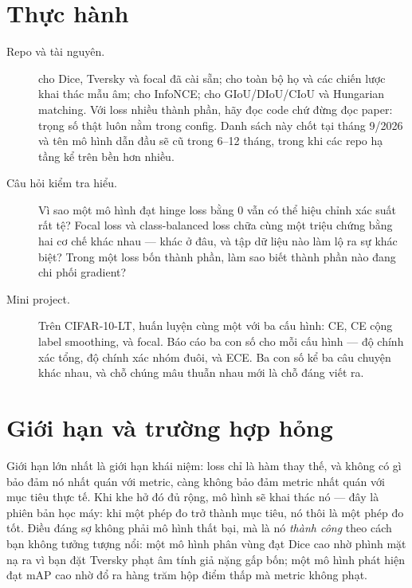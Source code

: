 \documentclass[../../deep_learning.tex]{subfiles}
\begin{document}
\section{Thực hành}

\begin{description}
\item[Repo và tài nguyên.]  cho Dice, Tversky và focal đã cài sẵn;  cho toàn bộ họ  và các chiến lược khai thác mẫu âm;  cho InfoNCE;  cho GIoU/DIoU/CIoU và Hungarian matching. Với loss nhiều thành phần, hãy đọc code chứ đừng đọc paper: trọng số thật luôn nằm trong config. Danh sách này chốt tại tháng 9/2026 và tên mô hình dẫn đầu sẽ cũ trong 6--12 tháng, trong khi các repo hạ tầng kể trên bền hơn nhiều.
\item[Câu hỏi kiểm tra hiểu.] Vì sao một mô hình đạt hinge loss bằng 0 vẫn có thể hiệu chỉnh xác suất rất tệ? Focal loss và class-balanced loss chữa cùng một triệu chứng bằng hai cơ chế khác nhau --- khác ở đâu, và tập dữ liệu nào làm lộ ra sự khác biệt? Trong một loss bốn thành phần, làm sao biết thành phần nào đang chi phối gradient?
\item[Mini project.] Trên CIFAR-10-LT, huấn luyện cùng một  với ba cấu hình: CE, CE cộng label smoothing, và focal. Báo cáo ba con số cho mỗi cấu hình --- độ chính xác tổng, độ chính xác nhóm đuôi, và ECE. Ba con số kể ba câu chuyện khác nhau, và chỗ chúng mâu thuẫn nhau mới là chỗ đáng viết ra.
\end{description}

\section{Giới hạn và trường hợp hỏng}

Giới hạn lớn nhất là giới hạn khái niệm: loss chỉ là hàm thay thế, và không có gì bảo đảm nó nhất quán với metric, càng không bảo đảm metric nhất quán với mục tiêu thực tế. Khi khe hở đó đủ rộng, mô hình sẽ khai thác nó --- đây là  phiên bản học máy: khi một phép đo trở thành mục tiêu, nó thôi là một phép đo tốt. Điều đáng sợ không phải mô hình thất bại, mà là nó \emph{thành công} theo cách bạn không tưởng tượng nổi: một mô hình phân vùng đạt Dice cao nhờ phình mặt nạ ra vì bạn đặt Tversky phạt âm tính giả nặng gấp bốn; một mô hình phát hiện đạt mAP cao nhờ đổ ra hàng trăm hộp điểm thấp mà metric không phạt.
\end{document}
